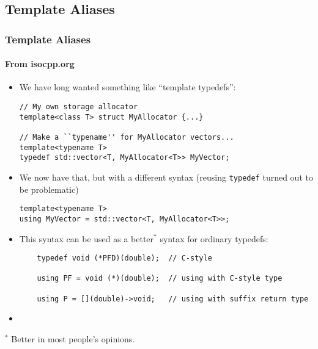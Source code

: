 \subsection{Template Aliases}
\begin{frame}[fragile,t]
\frametitle{Template Aliases}
\framesubtitle{From isocpp.org}
\begin{itemize}[<+->]
\item We have long wanted something like ``template typedefs'':
{\scriptsize\begin{verbatim}
// My own storage allocator
template<class T> struct MyAllocator {...}

// Make a ``typename'' for MyAllocator vectors...
template<typename T>
typedef std::vector<T, MyAllocator<T>> MyVector;
\end{verbatim}
}
\item We now have that, but with a different syntax (reusing
  \texttt{typedef} turned out to be problematic)
{\scriptsize\begin{verbatim}
template<typename T>
using MyVector = std::vector<T, MyAllocator<T>>;
\end{verbatim}
}
\item This syntax can be used as a better$^*$ syntax for ordinary
  typedefs:
{\scriptsize\begin{verbatim}
    typedef void (*PFD)(double);  // C-style

    using PF = void (*)(double);  // using with C-style type

    using P = [](double)->void;   // using with suffix return type
\end{verbatim}
}
\vskip 6pt
\item {}
\end{itemize}
\pause
$^*$ Better in most people's opinions.
\end{frame}


